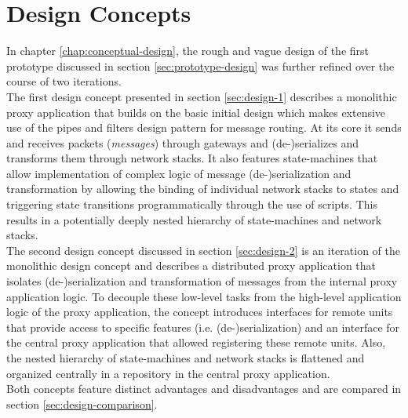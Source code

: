 \section{Design Concepts}
\label{sec:summary-concept}
In chapter \ref{chap:conceptual-design}, the rough and vague design of the first prototype discussed in section \ref{sec:prototype-design} was further refined over the course of two iterations.\\
The first design concept presented in section \ref{sec:design-1} describes a monolithic proxy application that builds on the basic initial design which makes extensive use of the pipes and filters design pattern for message routing. At its core it sends and receives packets (\emph{messages}) through gateways and (de-)serializes and transforms them through network stacks. It also features state-machines that allow implementation of complex logic of message (de-)serialization and transformation by allowing the binding of individual network stacks to states and triggering state transitions programmatically through the use of scripts. This results in a potentially deeply nested hierarchy of state-machines and network stacks.\\
The second design concept discussed in section \ref{sec:design-2} is an iteration of the monolithic design concept and describes a distributed proxy application that isolates (de-)serialization and transformation of messages from the internal proxy application logic. To decouple these low-level tasks from the high-level application logic of the proxy application, the concept introduces interfaces for remote units that provide access to specific features (i.e. (de-)serialization) and an interface for the central proxy application that allowed registering these remote units. Also, the nested hierarchy of state-machines and network stacks is flattened and organized centrally in a repository in the central proxy application.\\
Both concepts feature distinct advantages and disadvantages and are compared in section \ref{sec:design-comparison}.

